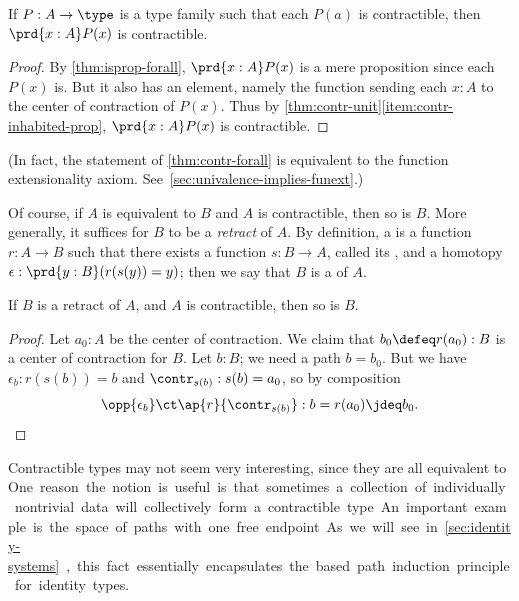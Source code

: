 \begin{lem}\label{thm:contr-forall}
  If $P:A\to\type$ is a type family such that each $P(a)$ is contractible, then $\prd{x:A} P(x)$ is contractible.
\end{lem}
\begin{proof}
  By \cref{thm:isprop-forall}, $\prd{x:A} P(x)$ is a mere proposition since each $P(x)$ is.
  But it also has an element, namely the function sending each $x:A$ to the center of contraction of $P(x)$.
  Thus by \cref{thm:contr-unit}\ref{item:contr-inhabited-prop}, $\prd{x:A} P(x)$ is contractible.
\end{proof}

%
(In fact, the statement of \cref{thm:contr-forall} is equivalent to the function extensionality axiom.
See~\cref{sec:univalence-implies-funext}.)

Of course, if $A$ is equivalent to $B$ and $A$ is contractible, then so is $B$.
More generally, it suffices for $B$ to be a \emph{retract} of $A$.
By definition, a 
%
%
is a function $r : A \to B$ such that there exists a function $s : B \to A$, called its ,
%
%
and a homotopy $\epsilon:\prd{y:B} (r(s(y))=y)$; then we say that $B$ is a %
of $A$.

\begin{lem}\label{thm:retract-contr}
  If $B$ is a retract of $A$, and $A$ is contractible, then so is $B$.
\end{lem}
\begin{proof}
  Let $a_0 : A$ be the center of contraction.
  We claim that $b_0 \defeq r(a_0) : B$ is a center of contraction for $B$.
  Let $b : B$; we need a path $b = b_0$.
  But we have $\epsilon_b : r(s(b)) = b$ and $\contr_{s(b)} : s(b) = a_0$, so by composition
  \[ \opp{\epsilon_b} \ct \ap{r}{\contr_{s(b)}} : b = r(a_0) \jdeq b_0. \qedhere\]
\end{proof}

Contractible types may not seem very interesting, since they are all equivalent to \unit.
One reason the notion is useful is that sometimes a collection of individually nontrivial data will collectively form a contractible type.
An important example is the space of paths with one free endpoint.
As we will see in \cref{sec:identity-systems}, this fact essentially
encapsulates the based path induction principle for identity types.


